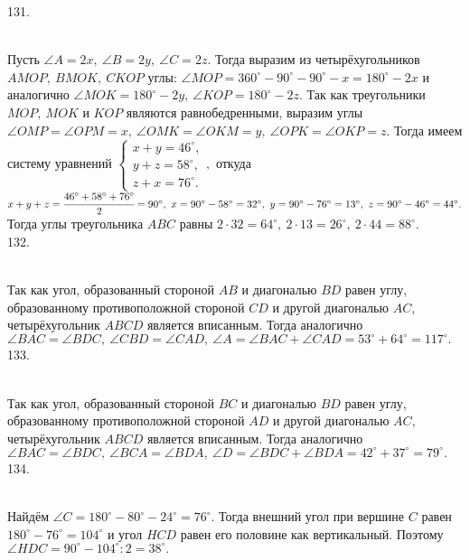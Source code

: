 131. \begin{figure}[ht!]
\end{figure}\\
Пусть $\angle A=2x,\ \angle B=2y,\ \angle C=2z.$ Тогда выразим из четырёхугольников $AMOP,\ BMOK,\ CKOP$ углы: $\angle MOP=360^\circ-90^\circ-90^\circ-x=180^\circ-2x$ и аналогично $\angle MOK=180^\circ-2y,\ \angle KOP=180^\circ-2z.$ Так как треугольники $MOP,\ MOK$ и $KOP$ являются равнобедренными, выразим углы $\angle OMP=\angle OPM=x,\ \angle OMK=\angle OKM=y,\ \angle OPK=\angle OKP=z.$ Тогда имеем систему уравнений $\begin{cases} x+y=46^\circ,\\ y+z=58^\circ,\\ z+x=76^\circ.\end{cases},$ откуда $x+y+z=\cfrac{46^\circ+58^\circ+76^\circ}{2}=90^\circ,\ x=90^\circ-58^\circ=32^\circ,\ y=90^\circ-76^\circ=13^\circ,\ z=90^\circ-46^\circ=44^\circ.$ Тогда углы треугольника $ABC$ равны $2\cdot32=64^\circ,\ 2\cdot13=26^\circ,\ 2\cdot44=88^\circ.$\\
132. \begin{figure}[ht!]
\end{figure}\\
Так как угол, образованный стороной $AB$ и диагональю $BD$ равен углу, образованному противоположной стороной $CD$ и другой диагональю $AC,$ четырёхугольник $ABCD$ является вписанным. Тогда аналогично $\angle BAC=\angle BDC,\ \angle CBD=\angle CAD,\ \angle A=\angle BAC+\angle CAD=53^\circ+64^\circ=117^\circ.$\\
133. \begin{figure}[ht!]
\end{figure}\\
Так как угол, образованный стороной $BC$ и диагональю $BD$ равен углу, образованному противоположной стороной $AD$ и другой диагональю $AC,$ четырёхугольник $ABCD$ является вписанным. Тогда аналогично $\angle BAC=\angle BDC,\ \angle BCA=\angle BDA,\ \angle D=\angle BDC+\angle BDA=42^\circ+37^\circ=79^\circ.$\\
134. \begin{figure}[ht!]
\end{figure}\\
Найдём $\angle C=180^\circ-80^\circ-24^\circ=76^\circ.$ Тогда внешний угол при вершине $C$ равен $180^\circ-76^\circ=104^\circ$ и угол $HCD$ равен его половине как вертикальный. Поэтому $\angle HDC=90^\circ-104^\circ:2=38^\circ.$
